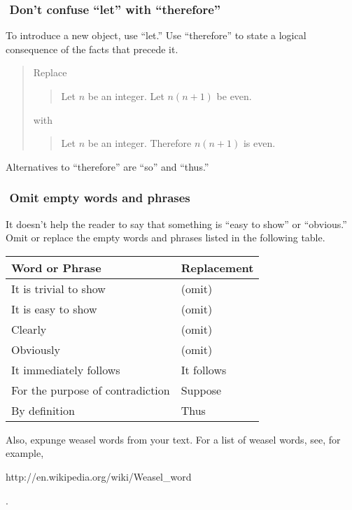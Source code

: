 \documentclass[12pt,fleqn]{article}
\newcounter{ex}\setcounter{ex}{0}
\newcommand{\ex}{%
\hspace{-0.2in} \setcounter{ex}{\value{ex}+1}
\theex \,\,}
\newcounter{se}\setcounter{se}{0}
\begin{document}
\subsubsection*{\ex Don't confuse ``let'' with ``therefore''}

To introduce a new object, use ``let.''  Use ``therefore'' to
state a logical consequence of the facts that precede it.


\begin{quote}
Replace
\begin{quote}
  Let \(n\) be an integer. Let \(n (n+1)\) be even.
\end{quote}
with
\begin{quote}
Let \(n\) be an integer.  Therefore \(n (n+1)\) is even.
\end{quote}
\end{quote}
Alternatives to ``therefore'' are ``so'' and ``thus.''


\subsubsection*{\ex  Omit empty words and phrases} 

It doesn't help the reader to say that something is 
``easy to show'' or ``obvious.'' Omit or replace 
the empty words and phrases listed in the following table.

\begin{center}
\begin{tabular}{| l l |}
\hline  \textbf {Word or Phrase} &  \textbf {Replacement} \\ 
\hline
It is trivial to show    & (omit) \\
It is easy to show     & (omit) \\   
Clearly   & (omit) \\
Obviously  & (omit) \\
It immediately follows & It follows \\
For the purpose of contradiction &  Suppose \\
By definition                    & Thus \\
\hline
\end{tabular}
\end{center}
Also, expunge weasel words from your text. For a list of weasel words,  see, for example,  
\begin{url} {http://en.wikipedia.org/wiki/Weasel_word} \end{url}.
\end{document}
